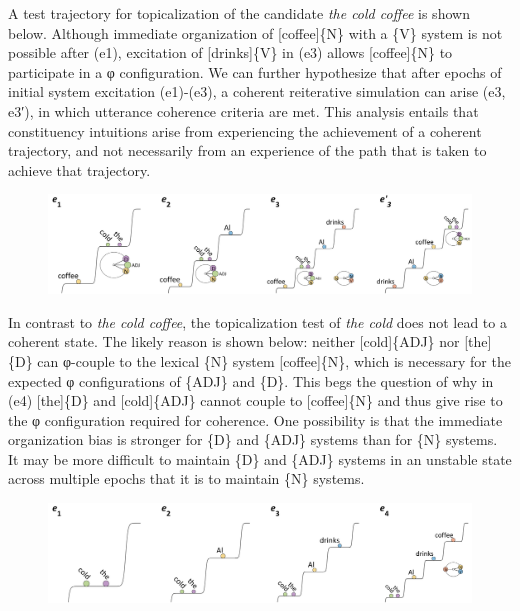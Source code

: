   A test trajectory for topicalization of the candidate \textit{the cold coffee} is shown below. Although immediate organization of [coffee]\{N\} with a \{V\} system is not possible after (e1), excitation of [drinks]\{V\} in (e3) allows [coffee]\{N\} to participate in a φ configuration. We can further hypothesize that after epochs of initial system excitation (e1)-(e3), a coherent reiterative simulation can arise (e3, e3′), in which utterance coherence criteria are met. This analysis entails that constituency intuitions arise from experiencing the achievement of a coherent trajectory, and not necessarily from an experience of the path that is taken to achieve that trajectory.

  
\begin{figure}
\includegraphics[width=\textwidth]{figures/Tilsen-img138.png}
\caption{\missingcaption}
\label{fig:}
\end{figure}
 

  In contrast to \textit{the cold coffee}, the topicalization test of \textit{the cold} does not lead to a coherent state. The likely reason is shown below: neither [cold]\{ADJ\} nor [the]\{D\} can φ-couple to the lexical \{N\} system [coffee]\{N\}, which is necessary for the expected φ configurations of \{ADJ\} and \{D\}. This begs the question of why in (e4) [the]\{D\} and [cold]\{ADJ\} cannot couple to [coffee]\{N\} and thus give rise to the φ configuration required for coherence. One possibility is that the immediate organization bias is stronger for \{D\} and \{ADJ\} systems than for \{N\} systems. It may be more difficult to maintain \{D\} and \{ADJ\} systems in an unstable state across multiple epochs that it is to maintain \{N\} systems.

  
\begin{figure}
\includegraphics[width=\textwidth]{figures/Tilsen-img139.png}
\caption{\missingcaption}
\label{fig:}
\end{figure}
 

